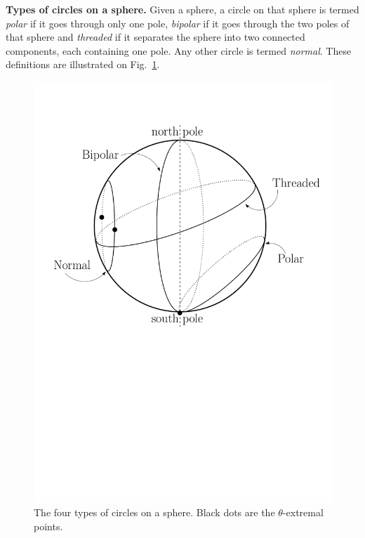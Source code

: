 {\color{cyan} %
\textbf{Types of circles on a sphere.}
Given a sphere, a circle on that sphere is termed
\textit{polar} if it goes through only one pole, \textit{bipolar} if
it goes through the two poles of that sphere and \textit{threaded} if
it separates the sphere into two connected components, each
containing one pole. Any other circle is termed \textit{normal}. These
definitions are illustrated on Fig.~\ref{fig-def-circles}.

\begin{ccTexOnly}
\begin{figure}[ht!]
\centerline{
 \includegraphics[height=.5\textwidth]{Circular_kernel_3/def_circles_extreme_pt}
}
\caption{The four types of circles on a sphere. Black dots
  are the $\theta$-extremal points.  \label{fig-def-circles}}
\end{figure}
\end{ccTexOnly}




}
